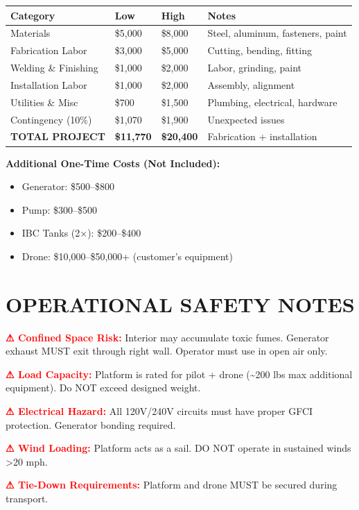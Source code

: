 \documentclass[11pt,letter]{article}
\begin{document}
\begin{tabular}{lllp{3cm}}
\toprule
\textbf{Category} & \textbf{Low} & \textbf{High} & \textbf{Notes} \\
\midrule
Materials & \$5,000 & \$8,000 & Steel, aluminum, fasteners, paint \\
Fabrication Labor & \$3,000 & \$5,000 & Cutting, bending, fitting \\
Welding \& Finishing & \$1,000 & \$2,000 & Labor, grinding, paint \\
Installation Labor & \$1,000 & \$2,000 & Assembly, alignment \\
Utilities \& Misc & \$700 & \$1,500 & Plumbing, electrical, hardware \\
Contingency (10\%) & \$1,070 & \$1,900 & Unexpected issues \\
\textbf{TOTAL PROJECT} & \textbf{\$11,770} & \textbf{\$20,400} & Fabrication + installation \\
\bottomrule
\end{tabular}

\textbf{Additional One-Time Costs (Not Included):}
\begin{itemize}
  \item Generator: \$500--\$800
  \item Pump: \$300--\$500
  \item IBC Tanks (2×): \$200--\$400
  \item Drone: \$10,000--\$50,000+ (customer's equipment)
\end{itemize}

\section{OPERATIONAL SAFETY NOTES}

\textcolor{red}{\textbf{⚠ Confined Space Risk:}} Interior may accumulate toxic fumes. Generator exhaust MUST exit through right wall. Operator must use in open air only.

\textcolor{red}{\textbf{⚠ Load Capacity:}} Platform is rated for pilot + drone (\textasciitilde{}200 lbs max additional equipment). Do NOT exceed designed weight.

\textcolor{red}{\textbf{⚠ Electrical Hazard:}} All 120V/240V circuits must have proper GFCI protection. Generator bonding required.

\textcolor{red}{\textbf{⚠ Wind Loading:}} Platform acts as a sail. DO NOT operate in sustained winds >20 mph.

\textcolor{red}{\textbf{⚠ Tie-Down Requirements:}} Platform and drone MUST be secured during transport.
\end{document}
